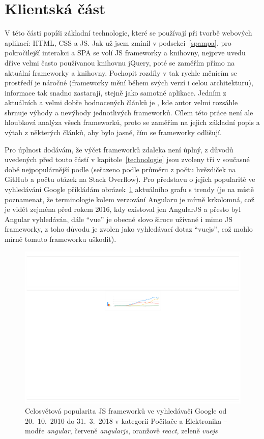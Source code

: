     \section{Klientská část}
    V této části popíši základní technologie, které se používají při tvorbě webových aplikací: HTML, CSS a JS. Jak už jsem zmínil v podsekci~\ref{spampa}, pro pokročilejší interakci a SPA se volí JS frameworky a knihovny, nejprve uvedu dříve velmi často používanou knihovnu jQuery, poté se zaměřím přímo na aktuální frameworky a knihovny. Pochopit rozdíly v tak rychle měnícím se prostředí je náročné (frameworky mění během svých verzí i celou architekturu), informace tak snadno zastarají, stejně jako samotné aplikace. Jedním z aktuálních a velmi dobře hodnocených článků je \cite{js-fw2}, kde autor velmi rozsáhle shrnuje výhody a nevýhody jednotlivých frameworků. Cílem této práce není ale hloubková analýza všech frameworků, proto se zaměřím na jejich základní popis a výtah z některých článků, aby bylo jasné, čím se frameworky odlišují.
    
    Pro úplnost dodávám, že výčet frameworků zdaleka není úplný, z důvodů uvedených před touto částí v kapitole~\ref{technologie} jsou zvoleny tři v současné době nejpopulárnější podle \cite{hot-frameworks} (seřazeno podle průměru z počtu hvězdiček na GitHub a počtu otázek na Stack Overflow). Pro představu o jejich popularitě ve vyhledávání Google přikládám obrázek~\ref{fig:js-frameworks} aktuálního grafu s trendy (je na místě poznamenat, že terminologie kolem verzování Angularu je mírně krkolomná, což je vidět zejména před rokem 2016, kdy existoval jen AngularJS a přesto byl Angular vyhledáván, dále \enquote{vue} je obecné slovo široce užívané i mimo JS frameworky, z toho důvodu je zvolen jako vyhledávací dotaz \enquote{vuejs}, což mohlo mírně tomuto frameworku uškodit).
    
    \begin{figure}[!hb]\centering
    	\includegraphics[width=1\textwidth]{img/js-frameworks}
    	\caption[Popularita JS frameworků ve vyhledávači Google]{Celosvětová popularita JS frameworků ve vyhledávači Google od 20.~10.~2010 do 31.~3.~2018 v kategorii Počítače a Elektronika -- modře \textit{angular}, červeně \textit{angularjs}, oranžově \textit{react}, zeleně \textit{vuejs} \cite{trends-google}}\label{fig:js-frameworks}
    \end{figure}
    
